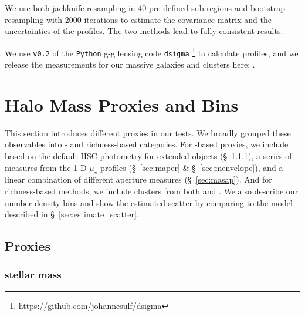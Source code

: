 \documentclass[fleqn,usenatbib,useAMS]{mnras}
\begin{document}
\begin{CJK*}{UTF8}{gbsn}
    We use both jackknife resampling in 40 pre-defined sub-regions and bootstrap resampling with
    2000 iterations to estimate the covariance matrix and the uncertainties of the \dsigma{}
    profiles.
    The two methods lead to fully consistent results.

    We use \texttt{v0.2} of the \texttt{Python} g-g lensing code \texttt{dsigma}
    \footnote{\url{https://github.com/johannesulf/dsigma}} to calculate \dsigma{} profiles, and we
    release the \dsigma{} measurements for our massive galaxies and clusters here:
    \href{https://zenodo.org/record/5259075}{\faDatabase}.

\section{Halo Mass Proxies and Bins}
    \label{sec:proxies}

    This section introduces different \mvir{} proxies in our \topn{} tests.
    We broadly grouped these observables into \mstar{}- and richness-based categories. 
    For \mstar{}-based proxies, we include \mstar{} based on the default HSC photometry for extended
    objects (\S\ \ref{sec:mcmodel}), a series of \mstar{} measures from the 1-D $\mu_{\star}$
    profiles (\S\ \ref{sec:maper} \& \S\ \ref{sec:menvelope}), and a linear combination of different
    aperture \mstar{} measures (\S\ \ref{sec:masap}).
    And for richness-based methods, we include clusters from both \redm{} and \camira{}. 
    We also describe our number density bins and show the estimated scatter by comparing to the model 
    described in \S\ \ref{sec:estimate_scatter}.
    
\subsection{Proxies}

\subsubsection{\cmodel{} stellar mass}
    \label{sec:mcmodel}


\end{CJK*}
\end{document}
